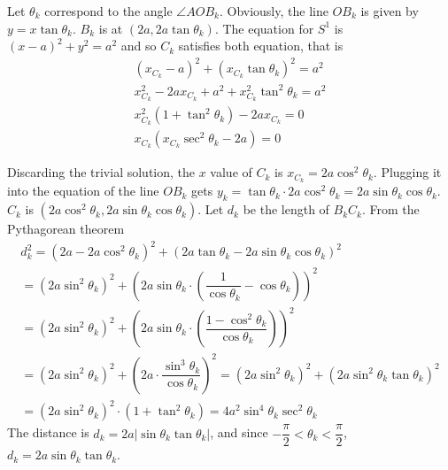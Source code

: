 \documentclass{article}
\begin{document}
	Let $\theta_k$ correspond to the angle $\angle AOB_k$. Obviously, the line $OB_k$ is given by $y = x \tan \theta_k$. $B_k$ is at $(2a, 2a \tan \theta_k )$. The equation for $S^1$ is $(x - a)^2 + y^2 = a^2$ and so $C_k$ satisfies both equation, that is
	\begin{gather*}
		(x_{C_k} - a)^2 + (x_{C_k} \tan \theta_k)^2 = a^2 \\
		x_{C_k}^2 - 2ax_{C_k} + a^2 + x_{C_k}^2 \tan^2 \theta_k = a^2 \\
		x_{C_k}^2 \left( 1 + \tan^2 \theta_k \right) - 2ax_{C_k} = 0 \\
		x_{C_k} \left( x_{C_k} \sec^2 \theta_k - 2a \right) = 0
	\end{gather*}
	
	Discarding the trivial solution, the $x$ value of $C_k$ is $x_{C_k} = 2a \cos^2 \theta_k$. Plugging it into the equation of the line $OB_k$ gets $y_k = \tan \theta_k \cdot 2a \cos^2 \theta_k = 2 a \sin \theta_k \cos \theta_k$. $C_k$ is $\left( 2a \cos^2 \theta_k, 2 a \sin \theta_k \cos \theta_k \right)$. Let $d_k$ be the length of $B_kC_k$. From the Pythagorean theorem
	\begin{gather*}
		d_k^2 = \left( 2a - 2a \cos^2 \theta_k  \right)^2 + \left( 2a \tan \theta_k - 2 a \sin \theta_k \cos \theta_k \right)^2 \\
		= \left( 2a \sin^2 \theta_k  \right)^2 + \left( 2a \sin \theta_k \cdot \left( \dfrac{1}{\cos \theta_k} - \cos \theta_k \right) \right)^2 \\
		= \left( 2a \sin^2 \theta_k  \right)^2 + \left( 2a \sin \theta_k \cdot \left( \dfrac{1 - \cos^2 \theta_k}{\cos \theta_k} \right) \right)^2 \\
		= \left( 2a \sin^2 \theta_k  \right)^2 + \left( 2a \cdot \dfrac{\sin^3 \theta_k}{\cos \theta_k} \right)^2 = \left( 2a \sin^2 \theta_k  \right)^2 + \left( 2a \sin^2 \theta_k \tan \theta_k \right)^2 \\
		= \left( 2a \sin^2 \theta_k  \right)^2 \cdot \left( 1 + \tan^2 \theta_k \right) = 4a^2 \sin^4 \theta_k \sec^2 \theta_k
	\end{gather*}
	The distance is $d_k = 2a \left| \sin \theta_k \tan \theta_k \right|$, and since $- \dfrac{\pi}{2} < \theta_k < \dfrac{\pi}{2}$, $d_k = 2a \sin \theta_k \tan \theta_k$.
	
\end{document}
